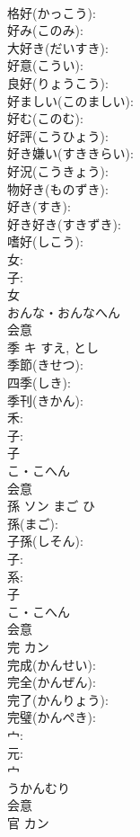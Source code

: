 \documentclass[8pt]{extreport}
\begin{document}
\begin{CJK}{UTF8}{min}
\\	格好(かっこう): 
\\	好み(このみ): 
\\	大好き(だいすき): 
\\	好意(こうい): 
\\	良好(りょうこう): 
\\	好ましい(このましい): 
\\	好む(このむ): 
\\	好評(こうひょう): 
\\	好き嫌い(すききらい): 
\\	好況(こうきょう): 
\\	物好き(ものずき): 
\\	好き(すき): 
\\	好き好き(すきずき): 
\\	嗜好(しこう): 
\\	女: 
\\	子: 
\\	女	
\\	おんな・おんなへん	
\\	会意 
\\	季	キ		すえ, とし	
\\	季節(きせつ): 
\\	四季(しき): 
\\	季刊(きかん): 
\\	禾: 
\\	子: 
\\	子	
\\	こ・こへん	
\\	会意 
\\	孫	ソン	まご	ひ	
\\	孫(まご): 
\\	子孫(しそん): 
\\	子: 
\\	系: 
\\	子	
\\	こ・こへん	
\\	会意 
\\	完	カン			
\\	完成(かんせい): 
\\	完全(かんぜん): 
\\	完了(かんりょう): 
\\	完璧(かんぺき): 
\\	宀: 
\\	元: 
\\	宀	
\\	うかんむり	
\\	会意 
\\	官	カン			

\end{CJK}
\end{document}
